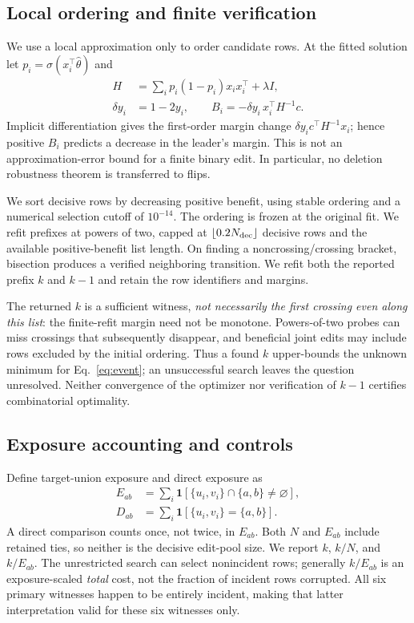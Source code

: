 \documentclass{article}
\newcommand{\sigmoid}{\sigma}
\begin{document}
\subsection{Local ordering and finite verification}
\label{sec:search}
We use a local approximation only to order candidate rows. At the fitted solution let $p_i=\sigmoid(x_i^\top\hat\theta)$ and
\begin{equation}
\begin{aligned}
H&=\sum_i p_i(1-p_i)x_i x_i^\top+\lambda I,\\
\delta y_i&=1-2y_i,\qquad B_i=-\delta y_i\,x_i^\top H^{-1}c.
\end{aligned}
\label{eq:benefit}
\end{equation}
Implicit differentiation gives the first-order margin change $\delta y_i c^\top H^{-1}x_i$; hence positive $B_i$ predicts a decrease in the leader's margin. This is not an approximation-error bound for a finite binary edit. In particular, no deletion robustness theorem is transferred to flips.

We sort decisive rows by decreasing positive benefit, using stable ordering and a numerical selection cutoff of $10^{-14}$. The ordering is frozen at the original fit. We refit prefixes at powers of two, capped at $\lfloor0.2N_{\rm dec}\rfloor$ decisive rows and the available positive-benefit list length. On finding a noncrossing/crossing bracket, bisection produces a verified neighboring transition. We refit both the reported prefix $k$ and $k-1$ and retain the row identifiers and margins.

The returned $k$ is a sufficient witness, \emph{not necessarily the first crossing even along this list}: the finite-refit margin need not be monotone. Powers-of-two probes can miss crossings that subsequently disappear, and beneficial joint edits may include rows excluded by the initial ordering. Thus a found $k$ upper-bounds the unknown minimum for Eq.~\eqref{eq:event}; an unsuccessful search leaves the question unresolved. Neither convergence of the optimizer nor verification of $k-1$ certifies combinatorial optimality.

\subsection{Exposure accounting and controls}
\label{sec:exposure}
Define target-union exposure and direct exposure as
\begin{equation}
\begin{aligned}
E_{ab}&=\sum_i\mathbf{1}\!\left[\{u_i,v_i\}\cap\{a,b\}\ne\varnothing\right],\\
D_{ab}&=\sum_i\mathbf{1}\!\left[\{u_i,v_i\}=\{a,b\}\right].
\end{aligned}
\label{eq:exposure}
\end{equation}
A direct comparison counts once, not twice, in $E_{ab}$. Both $N$ and $E_{ab}$ include retained ties, so neither is the decisive edit-pool size. We report $k$, $k/N$, and $k/E_{ab}$. The unrestricted search can select nonincident rows; generally $k/E_{ab}$ is an exposure-scaled \emph{total} cost, not the fraction of incident rows corrupted. All six primary witnesses happen to be entirely incident, making that latter interpretation valid for these six witnesses only.
\end{document}
